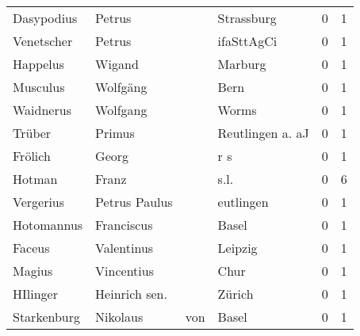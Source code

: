 \begin{center}
\begin{tiny}
\begin{longtabu}{llllrr}
               Dasypodius &                             Petrus &             &                                  Strassburg &          0 &         1 \\
               Venetscher &                             Petrus &             &                                  ifaSttAgCi &          0 &         1 \\
                 Happelus &                             Wigand &             &                                     Marburg &          0 &         1 \\
                 Musculus &                           Wolfgäng &             &                                        Bern &          0 &         1 \\
                Waidnerus &                           Wolfgang &             &                                       Worms &          0 &         1 \\
                   Trüber &                             Primus &             &                            Reutlingen a. aJ &          0 &         1 \\
                  Frölich &                              Georg &             &                                         r s &          0 &         1 \\
                   Hotman &                              Franz &             &                                        s.l. &          0 &         6 \\
                Vergerius &                      Petrus Paulus &             &                                   eutlingen &          0 &         1 \\
               Hotomannus &                         Franciscus &             &                                       Basel &          0 &         1 \\
                   Faceus &                         Valentinus &             &                                     Leipzig &          0 &         1 \\
                   Magius &                         Vincentius &             &                                        Chur &          0 &         1 \\
                 HIlinger &                      Heinrich sen. &             &                                      Zürich &          0 &         1 \\
              Starkenburg &                           Nikolaus &         von &                                       Basel &          0 &         1 \\

\end{longtabu}
\end{tiny}
\end{center}
